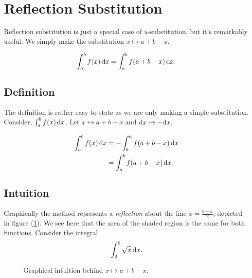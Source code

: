 \section{Reflection Substitution} \label{sec:reflectionsubstitution}

Reflection substitution is just a special case of $u$-substitution, but it's remarkably useful. We simply make the substitution $x\mapsto a+b-x$,

$$ \int_a^b f(x)\,\textrm{d}x = \int_a^b f(a+b-x)\,\textrm{d}x .$$

\subsection*{Definition}
The definition is rather easy to state as we are only making a simple substitution. Consider, $\int_a^b f(x)\,\textrm{d}x$. Let $x \mapsto a+b-x$ and $\textrm{d}x \mapsto -\textrm{d}x$.

\begin{align*}
    \int_a^b f(x)\,\textrm{d}x &= - \int_b^a f(a+b-x)\,\textrm{d}x \\
    &= \int_a^b f(a+b-x)\,\textrm{d}x
\end{align*}

\subsection*{Intuition}
Graphically the method represents a \textit{reflection} about the line $x=\frac{b+a}{2}$, depicted in figure (\ref{fig:reflectionsubstitution}). We see here that the area of the shaded region is the same for both functions. Consider the integral $$ \int_2^6 \sqrt{x}\,\textrm{d}x. $$

\begin{figure}
    \caption{Graphical intuition behind $x\mapsto a+b-x$.}
    \label{fig:reflectionsubstitution}
\end{figure}


